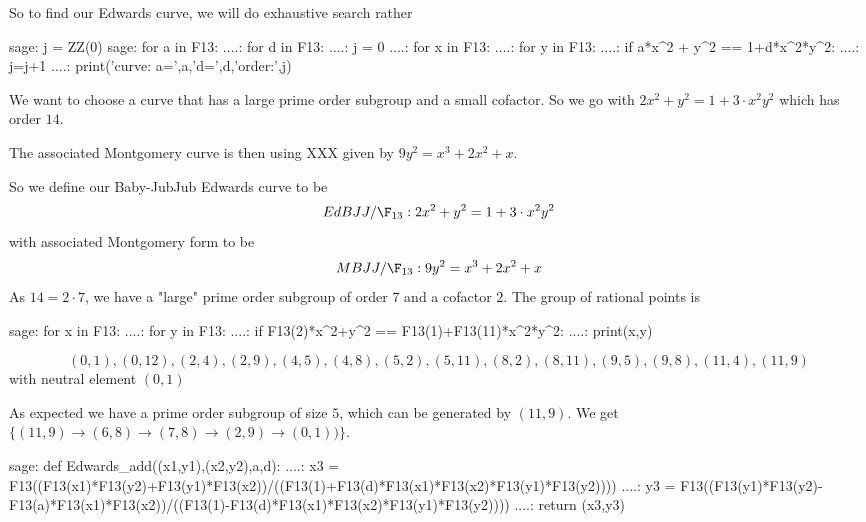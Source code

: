 So to find our Edwards curve, we will do exhaustive search rather 
\begin{sagecommandline}
sage: j = ZZ(0)
sage: for a in F13:
....:     for d in F13:
....:         j = 0
....:         for x in F13:
....:             for y in F13:
....:                 if a*x^2 + y^2 == 1+d*x^2*y^2:
....:                     j=j+1
....:         print('curve: a=',a,'d=',d,'order:',j)     
\end{sagecommandline}
We want to choose a curve that has a large prime order subgroup and a small cofactor. So we go
with $2x^2+y^2= 1+3\cdot x^2y^2$ which has order $14$. 


The associated Montgomery curve is then using XXX given by $9y^2 = x^3 +2x^2 + x$.

So we define our Baby-JubJub Edwards curve to be
$$
EdBJJ/\F_{13}: 2x^2+y^2= 1+3\cdot x^2y^2
$$
with associated Montgomery form to be
$$
MBJJ/\F_{13}:9y^2 = x^3 + 2x^2 + x
$$
As $14=2\cdot 7$, we have a "large" prime order subgroup of order $7$ and a cofactor $2$. The group of rational points is
\begin{sagecommandline}
sage: for x in F13:                                   
....:     for y in F13:                                                                                
....:         if F13(2)*x^2+y^2 == F13(1)+F13(11)*x^2*y^2:                                                     
....:             print(x,y)
\end{sagecommandline}

$$
(0, 1),
(0, 12),
(2, 4),
(2, 9),
(4, 5),
(4, 8),
(5, 2),
(5, 11),
(8, 2),
(8, 11),
(9, 5),
(9, 8),
(11, 4),
(11, 9)
$$
with neutral element $(0,1)$

As expected we have a prime order subgroup of size $5$, which can be generated by $(11,9)$. We get $\{(11,9)\to (6,8)\to (7,8) \to (2,9) \to (0,1))\}$.

\begin{sagecommandline}
sage: def Edwards_add((x1,y1),(x2,y2),a,d):
....:     x3 = F13((F13(x1)*F13(y2)+F13(y1)*F13(x2))/((F13(1)+F13(d)*F13(x1)*F13(x2)*F13(y1)*F13(y2))))
....:     y3 = F13((F13(y1)*F13(y2)-F13(a)*F13(x1)*F13(x2))/((F13(1)-F13(d)*F13(x1)*F13(x2)*F13(y1)*F13(y2))))
....:     return (x3,y3)
\end{sagecommandline}





